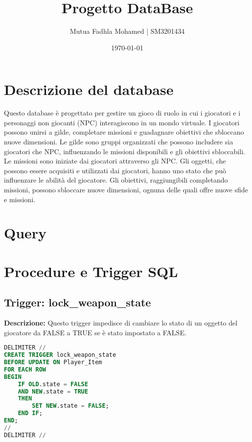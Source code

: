 \documentclass{article}
\title{Progetto DataBase}
\author{Mutua Fadhla Mohamed | SM3201434}
\date{\today}
\begin{document}
\maketitle

\section{Descrizione del database}

Questo database è progettato per gestire un gioco di ruolo in cui i giocatori e i personaggi non giocanti (NPC) interagiscono in un mondo virtuale. I giocatori possono unirsi a gilde, completare missioni e guadagnare obiettivi che sbloccano nuove dimensioni. Le gilde sono gruppi organizzati che possono includere sia giocatori che NPC, influenzando le missioni disponibili e gli obiettivi sbloccabili. Le missioni sono iniziate dai giocatori attraverso gli NPC. Gli oggetti, che possono essere acquisiti e utilizzati dai giocatori, hanno uno stato che può influenzare le abilità del giocatore. Gli obiettivi, raggiungibili completando missioni, possono sbloccare nuove dimensioni, ognuna delle quali offre nuove sfide e missioni.

\section{Query}

\section*{Procedure e Trigger SQL}

\subsection*{Trigger: lock\_weapon\_state}

\textbf{Descrizione:} Questo trigger impedisce di cambiare lo stato di un oggetto del giocatore da FALSE a TRUE se è stato impostato a FALSE.

\begin{lstlisting}[language=SQL]
DELIMITER //
CREATE TRIGGER lock_weapon_state
BEFORE UPDATE ON Player_Item
FOR EACH ROW
BEGIN
    IF OLD.state = FALSE
    AND NEW.state = TRUE
    THEN
        SET NEW.state = FALSE;
    END IF;
END;
//
DELIMITER //
\end{lstlisting}
\end{document}
